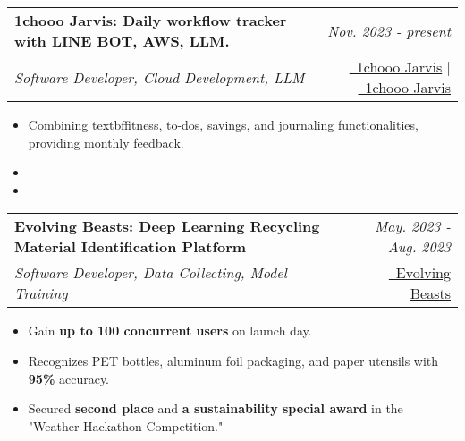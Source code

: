 \documentclass[a4paper,11pt]{article}
\makeatletter
\newcommand{\resumeSubheading}[4]{
\vspace{0.5mm}\item
    \begin{tabular*}{0.98\textwidth}[t]{l@{\extracolsep{\fill}}r}
        \textbf{#1} & \textit{\footnotesize{#4}} \\
        \textit{\footnotesize{#3}} &  \footnotesize{#2}\\
    \end{tabular*}
    \vspace{-2.4mm}
}
\newcommand{\resumeItemListStart}{\begin{justify}\begin{itemize}[
    leftmargin=3ex, 
    rightmargin=2ex, 
    noitemsep,
    labelsep=1.2mm,
    itemsep=0.5mm
    ]\small
}
\newcommand{\resumeItemListEnd}{\end{itemize}\end{justify}\vspace{-2mm}}
\makeatother
\begin{document}
        \vspace{-2.0mm}

        \resumeSubheading
            { 1chooo Jarvis: Daily workflow tracker with LINE BOT, AWS, LLM.} 
            {
                \href{https://github.com/1chooo/1chooo-jarvis}{\faGithub\ 1chooo Jarvis} 
                | 
                \href{https://1chooo.github.io/1chooo-jarvis/}{\textcolor{black}{\faDesktop}\ 1chooo Jarvis} 
            } %
            {Software Developer, Cloud Development, LLM}%
            {Nov. 2023 - present} %
            
            \vspace{-1.0mm}
            
            \resumeItemListStart
                \item {Combining textbf{fitness, to-dos, savings, and journaling functionalities}, providing monthly feedback.}
                \item {}
                \item {}
            \resumeItemListEnd

        \vspace{-2.0mm}
    
        \resumeSubheading
            { Evolving Beasts: Deep Learning Recycling Material Identification Platform} 
            {
                \href{https://github.com/1chooo/evolving-beasts}{\faGithub\ Evolving Beasts} 
            } %
            {Software Developer, Data Collecting, Model Training}%
            {May. 2023 - Aug. 2023} %
    
            \vspace{-1.0mm}
    
            \resumeItemListStart
                \item {Gain \textbf{up to 100 concurrent users} on launch day.}
                \item {Recognizes PET bottles, aluminum foil packaging, and paper utensils with \textbf{95\%} accuracy.}
                \item {Secured \textbf{second place} and \textbf{a sustainability special award} in the "Weather Hackathon Competition."}
            \resumeItemListEnd
            
\end{document}
